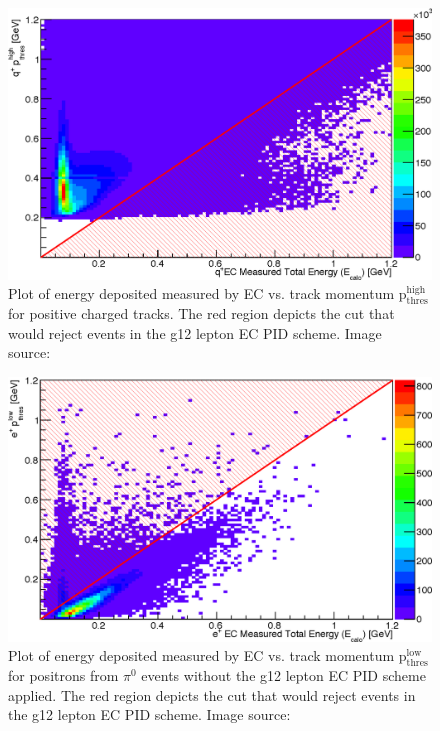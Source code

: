 \begin{figure}\begin{center}
									\includegraphics[width=0.8\figwidth]{figures/lepton/Pip_EChigh.eps}
									\caption[EC Deposited Energy Comparison to Upper Threshold Track Momentum for q$^+$ Tracks]{\label{fig:islep.pipEChigh}Plot of energy deposited measured by EC vs. track momentum p$\mathrm{_{thres}^{high}}$ for positive charged tracks. The red region depicts the cut that would reject events in the g12 lepton EC PID scheme. Image source:~\cite{thesiskunkel}}
\end{center}\end{figure}
								
\begin{figure}\begin{center}
										\includegraphics[width=0.8\figwidth]{figures/lepton/Pip_EClowcut.eps}
										\caption[EC Deposited Energy Comparison to Track Momentum for $e^+$ Candidates]{\label{fig:islep.pipEC}Plot of energy deposited measured by EC vs. track momentum p$\mathrm{_{thres}^{low}}$ for positrons from $\pi^0$ events without the g12 lepton EC PID scheme applied. The red region depicts the cut that would reject events in the g12 lepton EC PID scheme. Image source:~\cite{thesiskunkel}}
\end{center}\end{figure}
									
